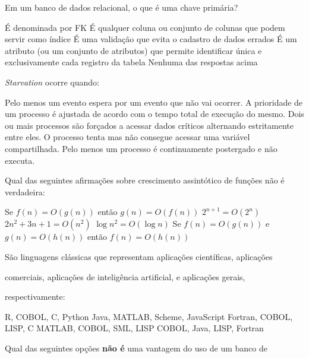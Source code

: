 \documentclass[12pt, addpoints]{exam}
\begin{document}
\begin{questions}
\question

Em um banco de dados relacional, o que é uma chave primária?


\begin{choices}
\choice É denominada por FK
\choice É qualquer coluna ou conjunto de colunas que podem servir como índice
\choice É uma validação que evita o cadastro de dados errados
\choice É um atributo (ou um conjunto de atributos) que permite identificar única e exclusivamente cada registro da tabela
\choice Nenhuma das respostas acima
\end{choices}

\question

\textit{Starvation} ocorre quando:
\begin{choices}
\choice Pelo menos um evento espera por um evento que não vai ocorrer.
\choice A prioridade de um processo é ajustada de acordo com o tempo total de execução do mesmo.
\choice Dois ou mais processos são forçados a acessar dados críticos alternando estritamente entre eles.
\choice O processo tenta mas não consegue acessar uma variável compartilhada.
\choice Pelo menos um processo é continuamente postergado e não executa.
\end{choices}

\question

Qual das seguintes afirmações sobre crescimento assintótico de funções não é verdadeira:
\begin{choices}
\choice Se \( f(n) = O(g(n)) \) então \( g(n) = O(f(n)) \)
\choice \( 2^{n+1} = O(2^n) \)
\choice \( 2n^2 + 3n + 1 = O(n^2) \)
\choice \( \log n^2 = O(\log n) \)
\choice Se \( f(n) = O(g(n)) \) e \( g(n) = O(h(n)) \) então \( f(n) = O(h(n)) \)
\end{choices}

\question

São linguagens clássicas que representam aplicações científicas, aplicações 

comerciais, aplicações de inteligência artificial, e aplicações gerais,

respectivamente:
\begin{choices}
\choice R, COBOL, C, Python
\choice Java, MATLAB, Scheme, JavaScript
\choice Fortran, COBOL, LISP, C
\choice MATLAB, COBOL, SML, LISP
\choice COBOL, Java, LISP, Fortran
\end{choices}

\question

Qual das seguintes opções \textbf{não é} uma vantagem do uso de um banco de


\end{questions}
\end{document}
